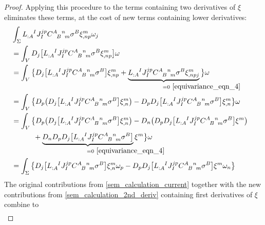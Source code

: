 \begin{proof}
  Applying this procedure to the terms containing two derivatives of $\xi$ eliminates these terms, at the cost of new terms containing lower derivatives:
  \begin{equation}\label{sem_calculation_2nd_deriv}
    \begin{multlined}
      \int_\Sigma L_{:A}^{\hphantom{:A}I} J_I^{jp} \gmc{A}{B}{n}{m}\sigma^B \xi^m_{,np}\omega_j \\
      \begin{aligned}
          &{} = \int_V D_j \big\lbrack L_{:A}^{\hphantom{:A}I} J_I^{jp} \gmc{A}{B}{n}{m}\sigma^B \xi^m_{,np}\big\rbrack \omega \\
          &{} = \int_V \big\{ D_j \big\lbrack L_{:A}^{\hphantom{:A}I} J_I^{jp} \gmc{A}{B}{n}{m}\sigma^B\big\rbrack \xi^m_{,np} + \underbrace{L_{:A}^{\hphantom{:A}I} J_I^{jp} \gmc{A}{B}{n}{m}\sigma^B \xi^m_{,npj}}_{\mathrlap{\!=0\ \eqref{equivariance_eqn_4}}} \big\}\omega \\
          &{} = \int_V \big\{ D_p \big( D_j \big\lbrack L_{:A}^{\hphantom{:A}I} J_I^{jp} \gmc{A}{B}{n}{m}\sigma^B\big\rbrack \xi^m_{,n} \big) - D_p D_j \big\lbrack L_{:A}^{\hphantom{:A}I} J_I^{jp} \gmc{A}{B}{n}{m}\sigma^B\big\rbrack \xi^m_{,n}\big\}\omega \\
          &{} = \int_V \big\{ D_p \big( D_j \big\lbrack L_{:A}^{\hphantom{:A}I} J_I^{jp} \gmc{A}{B}{n}{m}\sigma^B\big\rbrack \xi^m_{,n} \big) - D_n\big(D_p D_j \big\lbrack L_{:A}^{\hphantom{:A}I} J_I^{jp} \gmc{A}{B}{n}{m}\sigma^B\big\rbrack \xi^m\big) \\
          &{} \hphantom{= \int_V \big\{} + \underbrace{D_n D_p D_j \big\lbrack L_{:A}^{\hphantom{:A}I} J_I^{jp} \gmc{A}{B}{n}{m}\sigma^B\big\rbrack}_{\mathrlap{\!=0\ \eqref{equivariance_eqn_4}}} \xi^m\big\}\omega \\
          &{} = \int_\Sigma \big\{ D_j \big\lbrack L_{:A}^{\hphantom{:A}I} J_I^{jp} \gmc{A}{B}{n}{m}\sigma^B\big\rbrack \xi^m_{,n} \omega_p - D_p D_j \big\lbrack L_{:A}^{\hphantom{:A}I} J_I^{jp} \gmc{A}{B}{n}{m}\sigma^B\big\rbrack \xi^m \omega_n\big\}
      \end{aligned}
    \end{multlined}
  \end{equation}
  The original contributions from \eqref{sem_calculation_current} together with the new contributions from \eqref{sem_calculation_2nd_deriv} containing first derivatives of $\xi$ combine to
  \begin{equation}\label{sem_calculation_1st_deriv}
    \begin{multlined}

\end{multlined}
\end{equation}
\end{proof}
